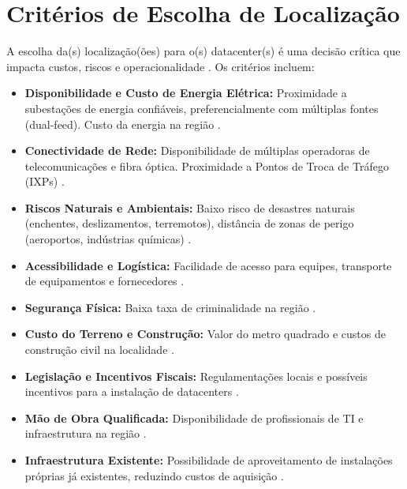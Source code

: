 \documentclass[
	12pt,				%
	oneside,			%
	a4paper,			%
	english,			%
	brazil				%
	]{abntex2unama}
\begin{document}
\section{Critérios de Escolha de Localização}
A escolha da(s) localização(ões) para o(s) datacenter(s) é uma decisão crítica que impacta custos, riscos e operacionalidade \cite{design_principles}. Os critérios incluem:
\begin{itemize}
	\item \textbf{Disponibilidade e Custo de Energia Elétrica:} Proximidade a subestações de energia confiáveis, preferencialmente com múltiplas fontes (dual-feed). Custo da energia na região \cite{power_distribution}.
	\item \textbf{Conectividade de Rede:} Disponibilidade de múltiplas operadoras de telecomunicações e fibra óptica. Proximidade a Pontos de Troca de Tráfego (IXPs) \cite{datacenter_networking}.
	\item \textbf{Riscos Naturais e Ambientais:} Baixo risco de desastres naturais (enchentes, deslizamentos, terremotos), distância de zonas de perigo (aeroportos, indústrias químicas) \cite{disaster_recovery}.
	\item \textbf{Acessibilidade e Logística:} Facilidade de acesso para equipes, transporte de equipamentos e fornecedores \cite{modular_datacenters}.
	\item \textbf{Segurança Física:} Baixa taxa de criminalidade na região \cite{datacenter_security}.
	\item \textbf{Custo do Terreno e Construção:} Valor do metro quadrado e custos de construção civil na localidade \cite{hyperscale_datacenters}.
	\item \textbf{Legislação e Incentivos Fiscais:} Regulamentações locais e possíveis incentivos para a instalação de datacenters \cite{green_datacenters}.
	\item \textbf{Mão de Obra Qualificada:} Disponibilidade de profissionais de TI e infraestrutura na região \cite{datacenter_automation}.
	\item \textbf{Infraestrutura Existente:} Possibilidade de aproveitamento de instalações próprias já existentes, reduzindo custos de aquisição \cite{capacity_planning}.
\end{itemize}
\end{document}
